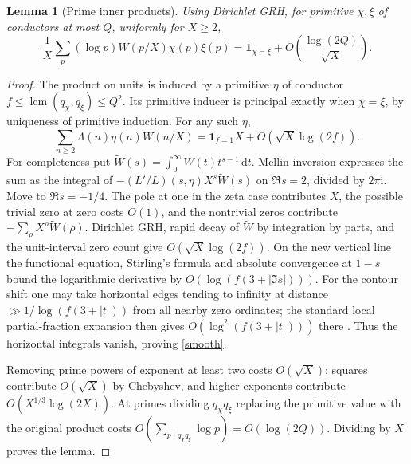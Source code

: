 \documentclass[11pt]{article}
\newtheorem{lemma}[theorem]{Lemma}
\newcommand{\ii}{\mathrm i}
\newcommand{\dd}{\,\mathrm d}
\begin{document}
\begin{lemma}[Prime inner products]\label{lem:gram}
Using Dirichlet GRH, for primitive $\chi,\xi$ of conductors at most $Q$, uniformly for $X\ge2$,
\[
 \frac1X\sum_p (\log p) W(p/X)\chi(p)\overline{\xi(p)}
       =\mathbf 1_{\chi=\xi}+O\!\left(\frac{\log(2Q)}{\sqrt X}\right).
\]
\end{lemma}
\begin{proof}
The product on units is induced by a primitive $\eta$ of conductor
$f\le\operatorname{lcm}(q_\chi,q_\xi)\le Q^2$. Its primitive inducer is principal exactly when $\chi=\xi$, by uniqueness of primitive induction. For any such $\eta$,
\begin{equation}\label{smooth}
 \sum_{n\ge2}\Lambda(n)\eta(n)W(n/X)
       =\mathbf 1_{f=1} X+O(\sqrt X\log(2f)).
\end{equation}
For completeness put $\widetilde W(s)=\int_0^\infty W(t)t^{s-1}\dd t$. Mellin inversion expresses the sum as the integral of
$-(L'/L)(s,\eta)X^s\widetilde W(s)$ on $\Re s=2$, divided by $2\pi\ii$. Move to $\Re s=-1/4$. The pole at one in the zeta case contributes $X$, the possible trivial zero at zero costs $O(1)$, and the nontrivial zeros contribute $-\sum_\rho X^\rho\widetilde W(\rho)$. Dirichlet GRH, rapid decay of $\widetilde W$ by integration by parts, and the unit-interval zero count give $O(\sqrt X\log(2f))$. On the new vertical line the functional equation, Stirling's formula and absolute convergence at $1-s$ bound the logarithmic derivative by $O(\log(f(3+|\Im s|)))$. For the contour shift one may take horizontal edges tending to infinity at distance $\gg1/\log(f(3+|t|))$ from all nearby zero ordinates; the standard local partial-fraction expansion then gives $O(\log^2(f(3+|t|)))$ there \cite[Lemma 2.2]{Banks}. Thus the horizontal integrals vanish, proving \eqref{smooth}.

Removing prime powers of exponent at least two costs $O(\sqrt X)$: squares contribute $O(\sqrt X)$ by Chebyshev, and higher exponents contribute $O(X^{1/3}\log(2X))$. At primes dividing $q_\chi q_\xi$ replacing the primitive value with the original product costs $O(\sum_{p\mid q_\chi q_\xi}\log p)=O(\log(2Q))$. Dividing by $X$ proves the lemma.
\end{proof}
\end{document}
